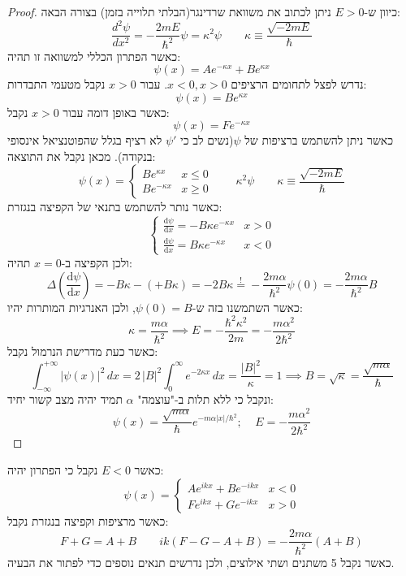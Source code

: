 \documentclass{tstextbook}
\begin{document}
\begin{proof}
כיוון ש-\(E>0\) ניתן לכתוב את משוואת שרדינגר(הבלתי תלוייה בזמן) בצורה הבאה:
$${\frac{d^{2}\psi}{d x^{2}}}=-{\frac{2m E}{\hbar^{2}}}\psi=\kappa^{2}\psi \qquad \kappa\equiv{\frac{\sqrt{-2m E}}{\hbar}}$$
כאשר הפתרון הכללי למשוואה זו תהיה:
$$\psi(x)=A e^{-\kappa x}+B e^{\kappa x}$$
נדרש לפצל לתחומים הרציפים \(x<0,x>0\). עבור \(x>0\) נקבל מטעמי התבדרות:
$$\psi(x)=Be^{\kappa x}$$
כאשר באופן דומה עבור \(x>0\) נקבל:
$$\psi(x)=Fe^{ -\kappa x }$$
כאשר ניתן להשתמש ברציפות של \(\psi\)(נשים לב כי \(\psi'\) לא רציף בגלל שהפוטנציאל אינסופי בנקודה). מכאן נקבל את התוצאה:
$$\psi(x)=\begin{cases}Be^{ \kappa x } & x\leq 0 \\Be^{ -\kappa x } & x\geq 0
\end{cases}\qquad \kappa^{2}\psi \qquad \kappa\equiv{\frac{\sqrt{-2m E}}{\hbar}}$$
כאשר נותר להשתמש בתנאי של הקפיצה בנגזרת:
$$\begin{cases}\frac{\mathrm{d} \psi}{\mathrm{d} x} =-B\kappa e^{ -\kappa x } & x>0 \\\frac{\mathrm{d} \psi}{\mathrm{d} x} =B\kappa e^{ -\kappa x } & x<0
\end{cases}$$
ולכן הקפיצה ב-\(x=0\) תהיה:
$$\Delta\left( \frac{\mathrm{d} \psi}{\mathrm{d} x}  \right)=-B\kappa-\left( +B\kappa \right)=-2B\kappa\overset{!}{=} -\frac{2m\alpha}{\hbar^{2}}\psi\left(0\right)=-\frac{2m\alpha}{\hbar^{2}}B$$
כאשר השתמשנו בזה ש-\(\psi(0)=B\), ולכן האנרגיות המותרות יהיו:
$$\kappa = \frac{m\alpha}{\hbar^{2}}\implies E=-\frac{\hbar^{2}\kappa^{2}}{2m}=-\frac{m\alpha^{2}}{2\hbar^{2}}$$
כאשר כעת מדרישת הנרמול נקבל:
$$\int_{-\infty}^{+\infty}|\psi(x)|^{2}\,d x=2\,|B|^{2}\int_{0}^{\infty}e^{-2\kappa x}\,d x={\frac{|B|^{2}}{\kappa}}=1\implies B=\sqrt{ \kappa }=\frac{\sqrt{ m\alpha }}{\hbar}$$
ונקבל כי ללא תלות ב-"עוצמה" \(\alpha\) תמיד יהיה מצב קשור יחיד:
$$\psi(x)=\frac{\sqrt{m\alpha}}{\hbar}e^{-m\alpha|x|/\hbar^{2}};\;\;\;\;E=-\frac{m\alpha^{2}}{2\hbar^{2}}$$

\end{proof}
\begin{proposition}
כאשר \(E<0\) נקבל כי הפתרון יהיה:
$$\psi(x)=\begin{cases}A e^{i k x}+B e^{-i k x} & x<0 \\F e^{i k x}+G e^{-i k x} & x> 0
\end{cases}$$
כאשר מרציפות וקפיצה בנגזרת נקבל:
$$F+G=A+B\qquad ik(F-G-A+B)=-\frac{2m\alpha}{\hbar^{2}}(A+B)$$
כאשר נקבל 5 משתנים ושתי אילוצים, ולכן נדרשים תנאים נוספים כדי לפתור את הבעיה.

\end{proposition}
\end{document}
